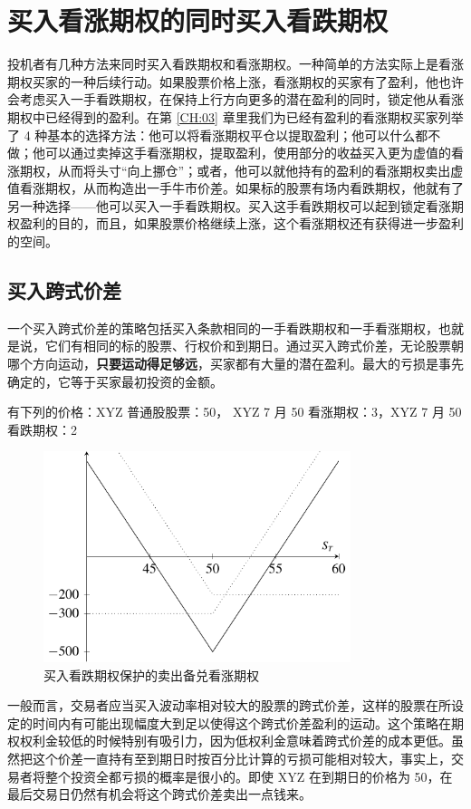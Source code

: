 \chapter{买入看涨期权的同时买入看跌期权\label{CH18}}
投机者有几种方法来同时买入看跌期权和看涨期权。一种简单的方法实际上是看涨期权买家的一种后续行动。如果股票价格上涨，看涨期权的买家有了盈利，他也许会考虑买入一手看跌期权，在保持上行方向更多的潜在盈利的同时，锁定他从看涨期权中已经得到的盈利。在第 \ref{CH:03} 章里我们为已经有盈利的看涨期权买家列举了 4 种基本的选择方法：他可以将看涨期权平仓以提取盈利；他可以什么都不做；他可以通过卖掉这手看涨期权，提取盈利，使用部分的收益买入更为虚值的看涨期权，从而将头寸“向上挪仓”；或者，他可以就他持有的盈利的看涨期权卖出虚值看涨期权，从而构造出一手牛市价差。如果标的股票有场内看跌期权，他就有了另一种选择——他可以买入一手看跌期权。买入这手看跌期权可以起到锁定看涨期权盈利的目的，而且，如果股票价格继续上涨，这个看涨期权还有获得进一步盈利的空间。
\section{买入跨式价差}
一个买入跨式价差的策略包括买入条款相同的一手看跌期权和一手看涨期权，也就是说，它们有相同的标的股票、行权价和到期日。通过买入跨式价差，无论股票朝哪个方向运动，\textbf{只要运动得足够远}，买家都有大量的潜在盈利。最大的亏损是事先确定的，它等于买家最初投资的金额。

\begin{tcolorbox}
    有下列的价格：XYZ 普通股股票：50， XYZ 7 月 50 看涨期权：3，XYZ 7 月 50 看跌期权：2
\end{tcolorbox}
\begin{figure}
    \centering
    \includegraphics[width=0.8\textwidth]{IMG/straddle.pdf}
    \caption{买入看跌期权保护的卖出备兑看涨期权}
    \label{fig:straddle}
\end{figure}
一般而言，交易者应当买入波动率相对较大的股票的跨式价差，这样的股票在所设定的时间内有可能出现幅度大到足以使得这个跨式价差盈利的运动。这个策略在期权权利金较低的时候特别有吸引力，因为低权利金意味着跨式价差的成本更低。虽然把这个价差一直持有至到期日时按百分比计算的亏损可能相对较大，事实上，交易者将整个投资全都亏损的概率是很小的。即使 XYZ 在到期日的价格为 50，在最后交易日仍然有机会将这个跨式价差卖出一点钱来。
